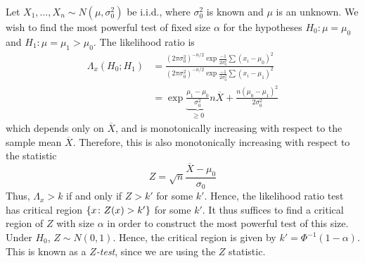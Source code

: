 \begin{example}
	Let \( X_1, \dots, X_n \sim N(\mu, \sigma_0^2) \) be i.i.d., where \( \sigma_0^2 \) is known and \( \mu \) is an unknown.
	We wish to find the most powerful test of fixed size \( \alpha \) for the hypotheses \( H_0 \colon \mu = \mu_0 \) and \( H_1 \colon \mu = \mu_1 > \mu_0 \).
	The likelihood ratio is
	\begin{align*}
		\Lambda_x(H_0;H_1) & = \frac{(2\pi \sigma_0^2)^{-n/2} \exp{\frac{-1}{2\sigma_0^2} \sum (x_i - \mu_0)^2}}{(2\pi \sigma_0^2)^{-n/2} \exp{\frac{-1}{2\sigma_0^2} \sum (x_i - \mu_1)^2}} \\
		                   & = \exp{\underbrace{\frac{\mu_1 - \mu_0}{\sigma_0^2}}_{\geq 0} n \overline X + \frac{n(\mu_0 - \mu_1)^2}{2\sigma_0^2}}
	\end{align*}
	which depends only on \( \overline X \), and is monotonically increasing with respect to the sample mean \( \overline X \).
	Therefore, this is also monotonically increasing with respect to the statistic
	\[
		Z = \sqrt{n}\frac{\overline X - \mu_0}{\sigma_0}
	\]
	Thus, \( \Lambda_x > k \) if and only if \( Z > k' \) for some \( k' \).
	Hence, the likelihood ratio test has critical region \( \qty{x\colon Z(x) > k'} \) for some \( k' \).
	It thus suffices to find a critical region of \( Z \) with size \( \alpha \) in order to construct the most powerful test of this size.
	Under \( H_0 \), \( Z \sim N(0,1) \).
	Hence, the critical region is given by \( k' = \Phi^{-1}(1-\alpha) \).
	This is known as a \textit{\( Z \)-test}, since we are using the \( Z \) statistic.
\end{example}

